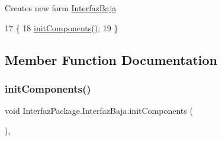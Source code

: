 Creates new form \mbox{\hyperlink{class_interfaz_package_1_1_interfaz_baja}{Interfaz\+Baja}} 
\begin{DoxyCode}
17                           \{
18         \mbox{\hyperlink{class_interfaz_package_1_1_interfaz_baja_a86efb81f258954491bbcd72b292d2b3b}{initComponents}}();
19     \}
\end{DoxyCode}


\subsection{Member Function Documentation}
\mbox{\label{class_interfaz_package_1_1_interfaz_baja_a86efb81f258954491bbcd72b292d2b3b}} 
\subsubsection{\texorpdfstring{init\+Components()}{initComponents()}}
{\footnotesize\ttfamily void Interfaz\+Package.\+Interfaz\+Baja.\+init\+Components (\begin{DoxyParamCaption}{ }\end{DoxyParamCaption})\hspace{0.3cm}{\ttfamily [inline]}, {\ttfamily [private]}}

